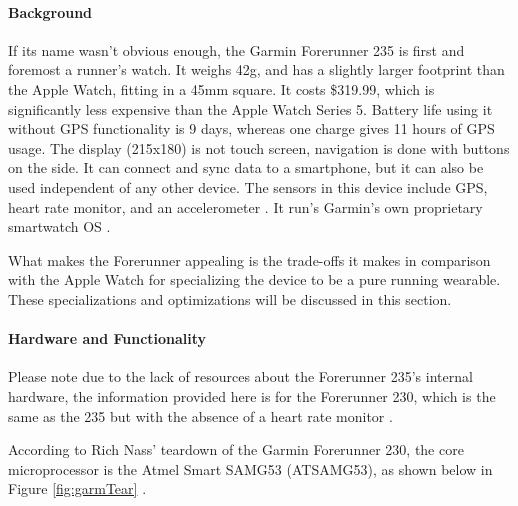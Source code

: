 \paragraph{Background}
If its name wasn't obvious enough, the Garmin Forerunner 235 is first and foremost a runner's
watch. It weighs 42g, and has a slightly larger footprint than the Apple Watch, fitting in a 45mm square.
It costs \$319.99, which is significantly less expensive than the Apple Watch Series 5. Battery life using
it without GPS functionality is 9 days, whereas one charge gives 11 hours of GPS usage. The display (215x180)
is not touch screen, navigation is done with buttons on the side. It can connect and 
sync data to a smartphone, but it can also be used independent of any other device. The sensors 
in this device include GPS, heart rate monitor, and an accelerometer \cite{garmin_price}. 
It run's Garmin's own proprietary smartwatch OS \cite{garmin_specs}.

What makes the Forerunner appealing is the trade-offs it makes in comparison with the Apple Watch
for specializing the device to be a pure running wearable. These specializations and optimizations will
be discussed in this section.

\paragraph{Hardware and Functionality}
Please note due to the lack of resources about the Forerunner 235's internal hardware,
the information provided here is for the Forerunner 230, which is the same as the 235
but with the absence of a heart rate monitor \cite{forerunner230235}.

According to Rich Nass' teardown of the Garmin Forerunner 230, the core microprocessor
is the Atmel Smart SAMG53 (ATSAMG53), as shown below in Figure \ref{fig:garmTear} \cite{forerunner_teardown}.

